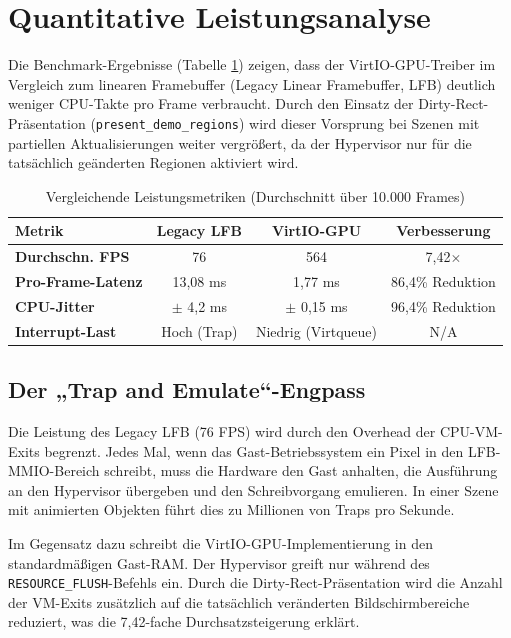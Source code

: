 \section{Quantitative Leistungsanalyse}

Die Benchmark-Ergebnisse (Tabelle \ref{tab:perf_metrics}) zeigen, dass der
VirtIO-GPU-Treiber im Vergleich zum linearen Framebuffer (Legacy Linear
Framebuffer, LFB) deutlich weniger CPU-Takte pro Frame verbraucht. Durch den
Einsatz der Dirty-Rect-Präsentation (\texttt{present\_demo\_regions}) wird
dieser Vorsprung bei Szenen mit partiellen Aktualisierungen weiter vergrößert,
da der Hypervisor nur für die tatsächlich geänderten Regionen aktiviert wird.

\begin{table}[ht]
\centering
\caption{Vergleichende Leistungsmetriken (Durchschnitt über 10.000 Frames)}
\label{tab:perf_metrics}
\begin{tabular}{l c c c}
\toprule
\textbf{Metrik} & \textbf{Legacy LFB} & \textbf{VirtIO-GPU} & \textbf{Verbesserung} \\ \midrule
\textbf{Durchschn. FPS} & 76 & 564 & 7,42$\times$ \\
\textbf{Pro-Frame-Latenz} & 13,08 ms & 1,77 ms & 86,4\% Reduktion \\
\textbf{CPU-Jitter} & $\pm$ 4,2 ms & $\pm$ 0,15 ms & 96,4\% Reduktion \\
\textbf{Interrupt-Last} & Hoch (Trap) & Niedrig (Virtqueue) & N/A \\ \bottomrule
\end{tabular}
\end{table}

\subsection{Der „Trap and Emulate“-Engpass}

Die Leistung des Legacy LFB (76 FPS) wird durch den Overhead der CPU-VM-Exits
begrenzt. Jedes Mal, wenn das Gast-Betriebssystem ein Pixel in den
LFB-MMIO-Bereich schreibt, muss die Hardware den Gast anhalten, die Ausführung
an den Hypervisor übergeben und den Schreibvorgang emulieren. In einer Szene
mit animierten Objekten führt dies zu Millionen von Traps pro Sekunde.

Im Gegensatz dazu schreibt die VirtIO-GPU-Implementierung in den
standardmäßigen Gast-RAM. Der Hypervisor greift nur während des
\texttt{RESOURCE\_FLUSH}-Befehls ein. Durch die Dirty-Rect-Präsentation wird
die Anzahl der VM-Exits zusätzlich auf die tatsächlich veränderten
Bildschirmbereiche reduziert, was die 7,42-fache Durchsatzsteigerung erklärt.


